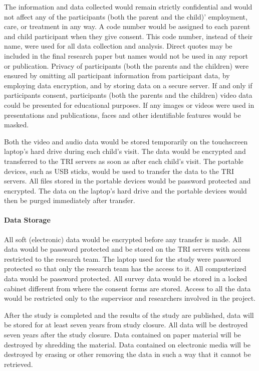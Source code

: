 \documentclass{ut-thesis}
\begin{document}
The information and data collected would remain strictly confidential and would not affect any of the participants (both the parent and the child)' employment, care, or treatment in any way. A code number would be assigned to each parent and child participant when they give consent. This code number, instead of their name, were used for all data collection and analysis. Direct quotes may be included in the final research paper but names would not be used in any report or publication. Privacy of participants (both the parents and the children) were ensured by omitting all participant information from participant data, by employing data encryption, and by storing data on a secure server.  If and only if participants consent, participants (both the parents and the children) video data could be presented for educational purposes.  If any images or videos were used in presentations and publications, faces and other identifiable features would be masked.

Both the video and audio data would be stored temporarily on the touchscreen laptop's hard drive during each child's visit. The data would be encrypted and transferred to the TRI servers as soon as after each child's visit. The portable devices, such as USB sticks, would be used to transfer the data to the TRI servers. All files stored in the portable devices would be password protected and encrypted. The data on the laptop's hard drive and the portable devices would then be purged immediately after transfer. 

\paragraph{Data Storage}
All soft (electronic) data would be encrypted before any transfer is made. All data would be password protected and be stored on the TRI servers with access restricted to the research team. The laptop used for the study were password protected so that only the research team has the access to it. All computerized data would be password protected. All survey data would be stored in a locked cabinet different from where the consent forms are stored. Access to all the data would be restricted only to the supervisor and researchers involved in the project. 

After the study is completed and the results of the study are published, data will be stored for at least seven years from study closure. All data will be destroyed seven years after the study closure. Data contained on paper material will be destroyed by shredding the material. Data contained on electronic media will be destroyed by erasing or other removing the data in such a way that it cannot be retrieved. 
\end{document}
